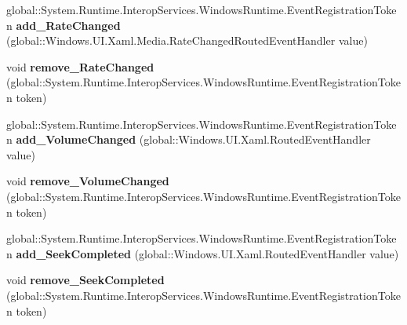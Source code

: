 \begin{DoxyCompactItemize}
global\+::\+System.\+Runtime.\+Interop\+Services.\+Windows\+Runtime.\+Event\+Registration\+Token {\bfseries add\+\_\+\+Rate\+Changed} (global\+::\+Windows.\+U\+I.\+Xaml.\+Media.\+Rate\+Changed\+Routed\+Event\+Handler value)
\item 
\mbox{\label{interface_windows_1_1_u_i_1_1_xaml_1_1_controls_1_1_i_media_element_a9e5266118a01c36612caa255627e769e}} 
void {\bfseries remove\+\_\+\+Rate\+Changed} (global\+::\+System.\+Runtime.\+Interop\+Services.\+Windows\+Runtime.\+Event\+Registration\+Token token)
\item 
\mbox{\label{interface_windows_1_1_u_i_1_1_xaml_1_1_controls_1_1_i_media_element_aedd52f355cd6b0ac289dab97618b03b2}} 
global\+::\+System.\+Runtime.\+Interop\+Services.\+Windows\+Runtime.\+Event\+Registration\+Token {\bfseries add\+\_\+\+Volume\+Changed} (global\+::\+Windows.\+U\+I.\+Xaml.\+Routed\+Event\+Handler value)
\item 
\mbox{\label{interface_windows_1_1_u_i_1_1_xaml_1_1_controls_1_1_i_media_element_a60f936214a2f097646cfe13f567cf130}} 
void {\bfseries remove\+\_\+\+Volume\+Changed} (global\+::\+System.\+Runtime.\+Interop\+Services.\+Windows\+Runtime.\+Event\+Registration\+Token token)
\item 
\mbox{\label{interface_windows_1_1_u_i_1_1_xaml_1_1_controls_1_1_i_media_element_a64d29cca7343776b34eef183fe2f0a47}} 
global\+::\+System.\+Runtime.\+Interop\+Services.\+Windows\+Runtime.\+Event\+Registration\+Token {\bfseries add\+\_\+\+Seek\+Completed} (global\+::\+Windows.\+U\+I.\+Xaml.\+Routed\+Event\+Handler value)
\item 
\mbox{\label{interface_windows_1_1_u_i_1_1_xaml_1_1_controls_1_1_i_media_element_adb3cb1c1f4bff532d4654363a56adcf1}} 
void {\bfseries remove\+\_\+\+Seek\+Completed} (global\+::\+System.\+Runtime.\+Interop\+Services.\+Windows\+Runtime.\+Event\+Registration\+Token token)
\item 
\mbox{\label{interface_windows_1_1_u_i_1_1_xaml_1_1_controls_1_1_i_media_element_a9ccfe5f23b86ca54424f89ee8816be21}} 

\end{DoxyCompactItemize}
